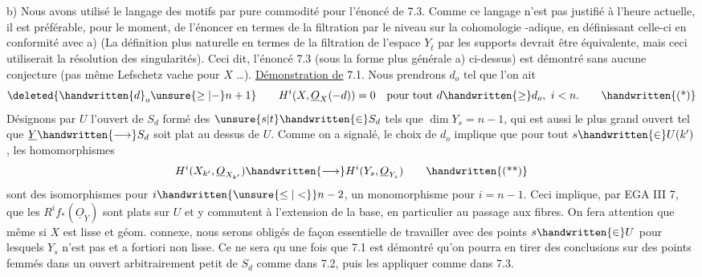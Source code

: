 b) Nous avons utilisé le langage des motifs par pure commodité pour l'énoncé de 7.3. Comme ce langage n'est pas justifié à l'heure actuelle, il est préférable, pour le moment, de l'énoncer en termes de la filtration par le niveau sur la cohomologie \handwritten{$\ell$}-adique, en définissant celle-ci en conformité avec a) (La définition plus naturelle en termes de la filtration de l'espace $Y_{\bar t}$ par les supports devrait être équivalente, mais ceci utiliserait la résolution des singularités). Ceci dit, l'énoncé 7.3 (sous la forme plus générale a) ci-dessus) est démontré sans aucune conjecture (pas même Lefschetz vache pour $X$ \ldots).
\uline{Démonstration de} 7.1. Nous prendrons  $d_o$   tel que l'on ait 
\[
\deleted{\handwritten{d}_o\unsure{\geq|-}n+1}\qquad H^i(X,\underline{O}_X(-d))=0\quad\text{pour tout }d\handwritten{\geq}d_o,\ i<n.
\tag*{\handwritten{(*)}}
\]
Désignons par $U$ l'ouvert de $S_d$ formé des $\unsure{s|t}\handwritten{\in}S_d$ tels que $\dim Y_s=n-1$, qui est aussi le plus grand ouvert tel que $\underline{Y}\handwritten{\longrightarrow}S_d$ soit plat au dessus de $U$. Comme on a signalé, le choix de $d_o$ implique que pour tout $s\handwritten{\in}U(k')$, les homomorphismes
\[
H^i(X_{k'},\underline{O}_{X_{k'}})\handwritten{\longrightarrow}H^i(Y_s,\underline{O}_{Y_s})
\tag*{\handwritten{(**)}}
\]
sont des isomorphismes pour $i\handwritten{\unsure{\leq|<}}n-2$, un monomorphisme pour $i=n-1$. Ceci implique, par EGA III 7, que les $R^if_*(\underline{O}_{\underline{Y}})$ sont plats sur $U$ et y commutent à l'extension de la base, en particulier au passage aux fibres. On fera attention que même si $X$ est lisse et géom. connexe, nous serons obligés de façon essentielle de travailler avec des points $s\handwritten{\in}U$ pour lesquels $Y_s$ n'est pas  et a fortiori non lisse. Ce ne sera qu une fois que 7.1 est démontré qu'on pourra en tirer des conclusions  sur des points femmés dans un ouvert arbitrairement petit de $S_d$ comme dans 7.2, puis les appliquer comme dans 7.3.

